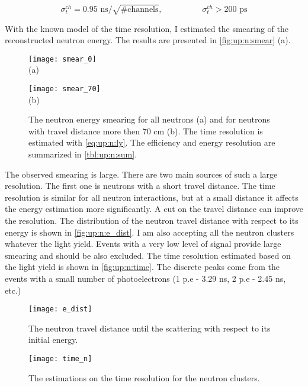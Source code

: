 \documentclass[main.tex]{subfiles}
\begin{document}
\begin{equation}
\label{eq:up:n:ch}
	\sigma^{ch}_t=0.95\text{ ns}/\sqrt{\text{\#channels}}, \hspace{2cm} \sigma^{ch}_t>200\text{ ps}
\end{equation}

With the known model of the time resolution, I estimated the smearing of the reconstructed neutron energy. The results are presented in \autoref{fig:up:n:smear} (a).

\begin{figure}[!ht]
	\centering
	\begin{minipage}{0.49\linewidth}
		\centering
		\texttt{[image: smear\_0]} \\ (a)
	\end{minipage}
	\begin{minipage}{0.49\linewidth}
		\centering
		\texttt{[image: smear\_70]} \\ (b)
	\end{minipage}
	\caption{The neutron energy smearing for all neutrons (a) and for neutrons with travel distance more then 70 cm (b). The time resolution is estimated with \autoref{eq:up:n:ly}. The efficiency and energy resolution are summarized in \autoref{tbl:up:n:sum}.}
	\label{fig:up:n:smear}
\end{figure}

The observed smearing is large. There are two main sources of such a large resolution. The first one is neutrons with a short travel distance. The time resolution is similar for all neutron interactions, but at a small distance it affects the energy estimation more significantly. A cut on the travel distance can improve the resolution. The distribution of the neutron travel distance with respect to its energy is shown in \autoref{fig:up:n:e_dist}. I am also accepting all the neutron clusters whatever the light yield. Events with a very low level of signal provide large smearing and should be also excluded. The time resolution estimated based on the light yield is shown in \autoref{fig:up:n:time}. The discrete peaks come from the events with a small number of photoelectrons (1 p.e - 3.29 ns, 2 p.e - 2.45 ns, etc.)

\begin{figure}[!ht]
	\centering
	\begin{minipage}{0.45\linewidth}
		\centering
		\texttt{[image: e\_dist]}
    \caption{The neutron travel distance until the scattering with respect to its initial energy.}
    \label{fig:up:n:e_dist}
	\end{minipage}
	\begin{minipage}{0.09\linewidth}
	\hspace{\linewidth}
	\end{minipage}
	\begin{minipage}{0.45\linewidth}
		\centering
		\texttt{[image: time\_n]}
    \caption{The estimations on the time resolution for the neutron clusters.}
    \label{fig:up:n:time}
	\end{minipage}
\end{figure}
\end{document}
